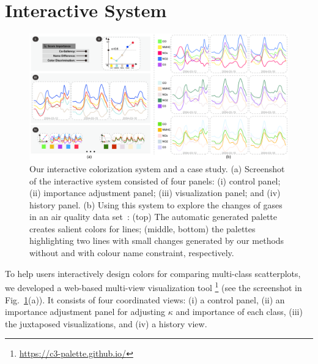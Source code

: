 \section{Interactive System}


\begin{figure}[ht]
\centering
\includegraphics[width=1.0\columnwidth]{figures/interface.pdf}
\caption{Our interactive colorization system and a case study. (a) Screenshot of the interactive system consisted of four panels: (i) control panel; (ii) importance adjustment panel; (iii) visualization panel; and (iv) history panel. (b) Using this system to explore the changes of gases in an air quality data set~\cite{DEVITO2008750}: (top) The automatic generated palette creates salient colors for  lines; (middle, bottom) the palettes highlighting two lines with small changes generated by our methods without and with colour name constraint, respectively.}
\vspace*{-3mm}
\label{fig:ui-case}
\end{figure}

\label{sec:interaction}
To help users interactively design colors for comparing multi-class scatterplots, we developed a web-based multi-view visualization tool \footnote{\small \url{https://c3-palette.github.io/}}
(see the screenshot in Fig.~\ref{fig:ui-case}(a)).
It consists of four coordinated views: (i) a control panel, (ii) an importance adjustment panel for adjusting $\kappa$ and  importance of each class, (iii) the juxtaposed visualizations, and (iv) a history view. 

